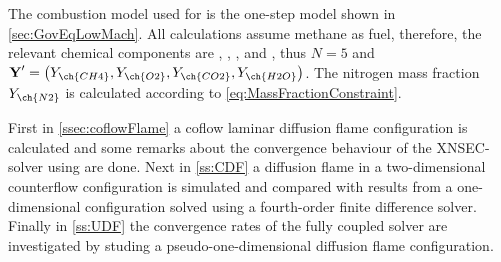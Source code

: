 The combustion model used for is the one-step model shown in \cref{sec:GovEqLowMach}. All calculations assume methane as fuel, therefore, the relevant chemical components are , , ,  and , thus $N = 5$ and $\vec{Y}' = \left(Y_{\ch{CH4}},Y_{\ch{O2}},Y_{\ch{CO2}},Y_{\ch{H2O}}\right)$. The nitrogen mass fraction $Y_{\ch{N2}}$ is calculated according to \cref{eq:MassFractionConstraint}.%

First in \cref{ssec:coflowFlame} a coflow laminar diffusion flame configuration is calculated and some remarks about the convergence behaviour of the XNSEC-solver using are done. Next in \cref{ss:CDF} a diffusion flame in a two-dimensional counterflow configuration is simulated and compared with results from a one-dimensional configuration solved using a fourth-order finite difference solver. Finally in \cref{ss:UDF} the convergence rates of the fully coupled solver are investigated by studing a pseudo-one-dimensional diffusion flame configuration.





\FloatBarrier
